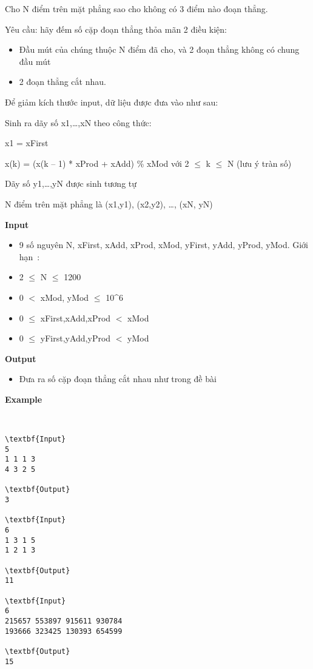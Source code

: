 

Cho N điểm trên mặt phẳng sao cho không có 3 điểm nào đoạn thẳng.

Yêu cầu: hãy đếm số cặp đoạn thẳng thỏa mãn 2 điều kiện:
\begin{itemize}
	\item 

Đầu mút của chúng thuộc N điểm đã cho, và 2 đoạn thẳng không có chung đầu mút
	\item 

2 đoạn thẳng cắt nhau.
\end{itemize}

Để giảm kích thước input, dữ liệu được đưa vào như sau:

Sinh ra dãy số x1,…,xN theo công thức:

x1 = xFirst

x(k) = (x(k – 1) * xProd + xAdd) \% xMod với 2  $\le$  k  $\le$  N (lưu ý tràn số)

Dãy số y1,…,yN được sinh tương tự

N điểm trên mặt phẳng là (x1,y1), (x2,y2), …, (xN, yN)

\textbf{Input}
\begin{itemize}
	\item 

9 số nguyên N, xFirst, xAdd, xProd, xMod, yFirst, yAdd, yProd, yMod. Giới hạn :
	\item 

2  $\le$  N  $\le$  1200
	\item 

0 $<$ xMod, yMod  $\le$  10^6
	\item 

0  $\le$  xFirst,xAdd,xProd $<$ xMod
	\item 

0  $\le$  yFirst,yAdd,yProd $<$ yMod
\end{itemize}

\textbf{Output}
\begin{itemize}
	\item 

Đưa ra số cặp đoạn thẳng cắt nhau như trong đề bài
\end{itemize}

\textbf{Example}

 
\begin{verbatim}
\textbf{Input}
5
1 1 1 3
4 3 2 5

\textbf{Output}
3

\textbf{Input}
6
1 3 1 5
1 2 1 3

\textbf{Output}
11

\textbf{Input}
6
215657 553897 915611 930784
193666 323425 130393 654599

\textbf{Output}
15\end{verbatim}
